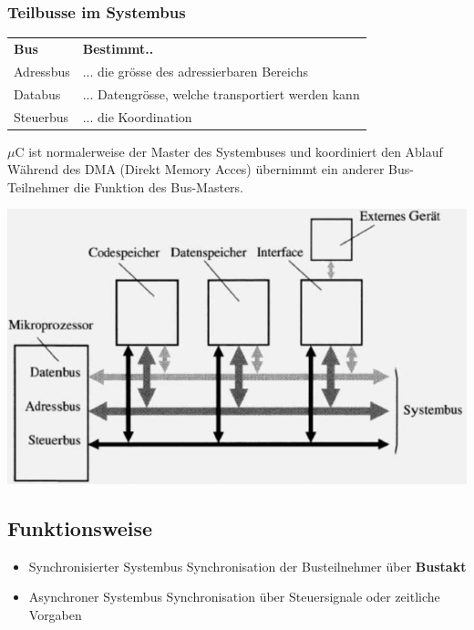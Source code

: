 \begin{minipage}{0.6\linewidth}
\subsubsection{Teilbusse im Systembus}
\begin{tabular}{ll}
    \textbf{Bus}    &\textbf{Bestimmt..}\\
    Adressbus       &... die grösse des adressierbaren Bereichs\\
    Databus         &... Datengrösse, welche transportiert werden kann\\
    Steuerbus       &... die Koordination\\  
\end{tabular}
$ \mu $C ist normalerweise der Master des Systembuses und koordiniert den Ablauf\newline
Während des DMA (Direkt Memory Acces) übernimmt ein anderer Bus-Teilnehmer die Funktion des Bus-Masters.
\end{minipage}
\begin{minipage}{0.4\linewidth}
\includegraphics[width=\textwidth]{images/SystembusSpeicherSpeichersystem/busuebersicht}
\end{minipage}

\subsection{Funktionsweise}
\begin{itemize}
    \item Synchronisierter Systembus
    \subitem Synchronisation der Busteilnehmer über \textbf{Bustakt}
    \item Asynchroner Systembus
    \subitem Synchronisation über Steuersignale oder zeitliche Vorgaben
\end{itemize}


